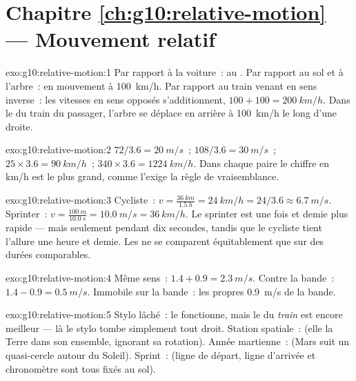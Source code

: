 \section*{Chapitre \ref{ch:g10:relative-motion} --- Mouvement relatif}

\begin{solution}{exo:g10:relative-motion:1}
Par rapport à la voiture~: au . Par rapport au sol et à
l'arbre~: en mouvement à \qty{100}{km/h}. Par rapport au train venant
en sens inverse~: les vitesses en sens opposés s'additionnent,
$100 + 100 = \qty{200}{km/h}$. Dans le  du train du
passager, l'arbre se déplace en arrière à \qty{100}{km/h} le long
d'une droite.
\end{solution}

\begin{solution}{exo:g10:relative-motion:2}
$72 / 3.6 = \qty{20}{m/s}$~; $108 / 3.6 = \qty{30}{m/s}$~;
$25 \times 3.6 = \qty{90}{km/h}$~; $340 \times 3.6 = \qty{1224}{km/h}$.
Dans chaque paire le chiffre en \unit{km/h} est le plus grand, comme
l'exige la règle de vraisemblance.
\end{solution}

\begin{solution}{exo:g10:relative-motion:3}
Cycliste~: $v = \frac{\qty{36}{km}}{\qty{1.5}{h}} = \qty{24}{km/h}
= 24/3.6 \approx \qty{6.7}{m/s}$. Sprinter~:
$v = \frac{\qty{100}{m}}{\qty{10.0}{s}} = \qty{10.0}{m/s}
= \qty{36}{km/h}$. Le sprinter est une fois et demie plus rapide ---
mais seulement pendant dix secondes, tandis que le cycliste tient
l'allure une heure et demie. Les  ne se
comparent équitablement que sur des durées comparables.
\end{solution}

\begin{solution}{exo:g10:relative-motion:4}
Même sens~: $1.4 + 0.9 = \qty{2.3}{m/s}$. Contre la bande~:
$1.4 - 0.9 = \qty{0.5}{m/s}$. Immobile sur la bande~: les propres
\qty{0.9}{m/s} de la bande.
\end{solution}

\begin{solution}{exo:g10:relative-motion:5}
Stylo lâché~: le  fonctionne, mais le
 du \emph{train} est encore meilleur --- là le stylo tombe
simplement tout droit. Station spatiale~:
 (elle  la Terre
dans son ensemble, ignorant sa rotation). Année martienne~:
 (Mars suit un quasi-cercle autour
du Soleil). Sprint~:  (ligne de départ,
ligne d'arrivée et chronomètre sont tous fixés au sol).
\end{solution}

